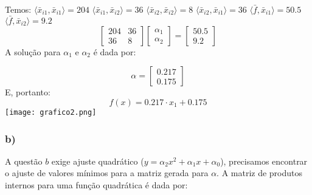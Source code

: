 \documentclass{article}
\begin{document}
\noindent Temos:\hfill\break\hfill\break
$\langle \bar{x}_{i1}, \bar{x}_{i1} \rangle = 204$\hfill\break
$\langle \bar{x}_{i1}, \bar{x}_{i2} \rangle = 36$\hfill\break
$\langle \bar{x}_{i2}, \bar{x}_{i2} \rangle = 8$\hfill\break
$\langle \bar{x}_{i2}, \bar{x}_{i1} \rangle = 36$\hfill\break
$\langle \bar{f}, \bar{x}_{i1} \rangle = 50.5$\hfill\break
$\langle \bar{f}, \bar{x}_{i2} \rangle = 9.2$\hfill\break
\[
\begin{bmatrix}
204 & 36 \\ 
36 & 8 
\end{bmatrix}
\begin{bmatrix}
    \alpha_1 \\ 
    \alpha_2 
\end{bmatrix}  
=
\begin{bmatrix}
50.5 \\ 
9.2 
\end{bmatrix}
\]
A solução para \(\alpha_1\) e \(\alpha_2\) é dada por:

\[
\alpha = 
\begin{bmatrix}
0.217 \\
0.175
\end{bmatrix}
\]
E, portanto:
\[
f(x) = 0.217 \cdot x_1 + 0.175
\]
\texttt{[image: grafico2.png]}
\subsubsection*{b)}
A questão \(b\) exige ajuste quadrático ($y = \alpha_2 x^2 + \alpha_1 x + \alpha_0 $), precisamos encontrar o ajuste de valores mínimos para a matriz gerada para $\alpha$.
A matriz de produtos internos para uma função quadrática é dada por:
\end{document}
